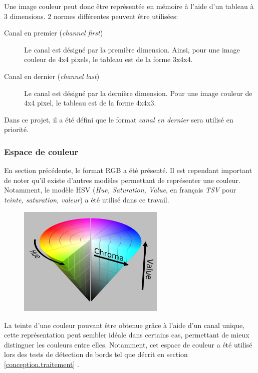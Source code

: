 Une image couleur peut donc être représentée en mémoire à l'aide d'un tableau à 3 dimensions. 2 normes différentes peuvent être utilisées:
\begin{description}
    \item[Canal en premier (\textit{channel first})] Le canal est désigné par la première dimension. Ainsi, pour une image couleur de 4x4 pixels, le tableau est de la forme 3x4x4.
    \item[Canal en dernier (\textit{channel last})] Le canal est désigné par la dernière dimension. Pour une image couleur de 4x4 pixel, le tableau est de la forme 4x4x3.
\end{description}

Dans ce projet, il a été défini que le format \textit{canal en dernier} sera utilisé en priorité. 

\subsubsection{Espace de couleur}\label{techno.traitement.repr.coul}
En section précédente, le format RGB a été présenté. Il est cependant important de noter qu'il existe d'autres modèles permettant de représenter une couleur. Notamment, le modèle HSV (\textit{Hue, Saturation, Value}, en français \textit{TSV} pour \textit{teinte, saturation, valeur}) a été utilisé dans ce travail. \autocite{wiki:HSV} 

\begin{figure}[ht]
    \includegraphics[width=70mm]{img/bases_technologiques/HSV.png}
    \centering
\end{figure}

La teinte d'une couleur pouvant être obtenue grâce à l'aide d'un canal unique, cette représentation peut sembler idéale dans certains cas, permettant de mieux distinguer les couleurs entre elles. Notamment, cet espace de couleur a été utilisé lors des tests de détection de bords tel que décrit en section \ref{conception.traitement} .

